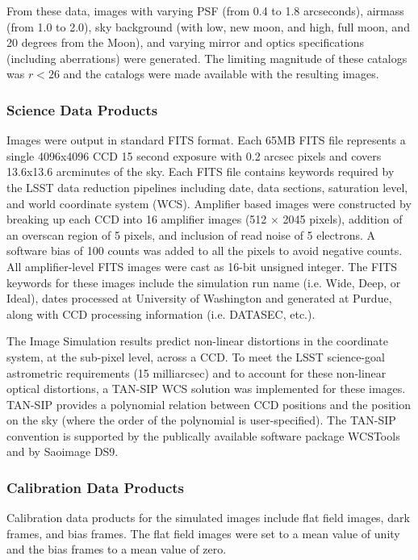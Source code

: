 From these data, images with varying PSF (from 0.4 to 1.8 arcseconds),
airmass (from 1.0 to 2.0), sky background (with low, new moon, and
high, full moon, and 20 degrees from the Moon), and varying mirror and
optics specifications (including aberrations) were generated.  The
limiting magnitude of these catalogs was $r<26$ and the catalogs were
made available with the resulting images.

\subsubsection{Science Data Products}

Images were output in standard FITS format. Each 65MB FITS file
represents a single 4096x4096 CCD 15 second exposure with 0.2 arcsec
pixels and covers 13.6x13.6 arcminutes of the sky. Each FITS file
contains keywords required by the LSST data reduction pipelines
including date, data sections, saturation level, and world coordinate
system (WCS).  Amplifier based images were constructed by breaking up
each CCD into 16 amplifier images (512 $\times$ 2045 pixels), addition
of an overscan region of 5 pixels, and inclusion of read noise of 5
electrons.  A software bias of 100 counts was added to all the pixels
to avoid negative counts.  All amplifier-level FITS images were cast
as 16-bit unsigned integer. The FITS keywords for these images include
the simulation run name (i.e. Wide, Deep, or Ideal), dates processed
at University of Washington and generated at Purdue, along with CCD
processing information (i.e. DATASEC, etc.).

The Image Simulation results predict non-linear distortions in the
coordinate system, at the sub-pixel level, across a CCD. To meet the
LSST science-goal astrometric requirements (15 milliarcsec) and to
account for these non-linear optical distortions, a TAN-SIP WCS
solution was implemented for these images. TAN-SIP provides a
polynomial relation between CCD positions and the position on the sky
(where the order of the polynomial is user-specified). The TAN-SIP
convention is supported by the publically available software package
WCSTools and by Saoimage DS9. 

\subsubsection{Calibration Data Products}

Calibration data products for the simulated images include flat field
images, dark frames, and bias frames. The flat field images were set
to a mean value of unity and the bias frames to a mean value
of zero.

